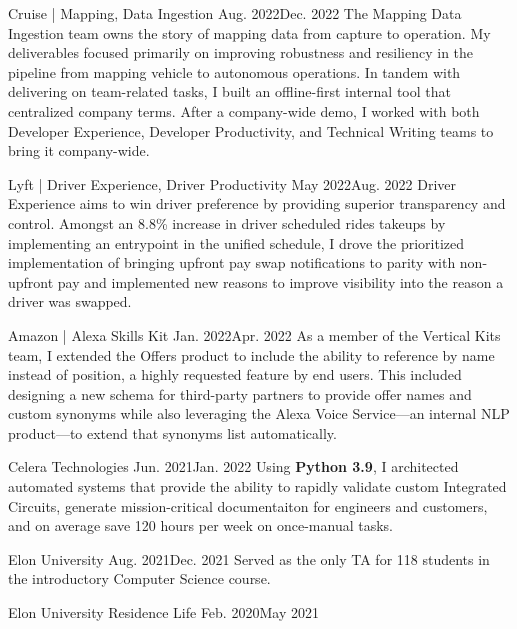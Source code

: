 \documentclass{listofpersonalprofessionalachievements}
\begin{document}
\begin{itemize}
    {Cruise | Mapping, Data Ingestion}
    {Aug. 2022}{Dec. 2022}
    {The Mapping Data Ingestion team owns the story of mapping data from capture to operation. My deliverables focused primarily on improving robustness and resiliency in the pipeline from mapping vehicle to autonomous operations. In tandem with delivering on team-related tasks, I built an offline-first internal tool that centralized company terms. After a company-wide demo, I worked with both Developer Experience, Developer Productivity, and Technical Writing teams to bring it company-wide.}

    {Lyft | Driver Experience, Driver Productivity}
    {May 2022}{Aug. 2022}
    {Driver Experience aims to win driver preference by providing superior transparency and control. Amongst an 8.8\% increase in driver scheduled rides takeups by implementing an entrypoint in the unified schedule, I drove the prioritized implementation of bringing upfront pay swap notifications to parity with non-upfront pay and implemented new reasons to improve visibility into the reason a driver was swapped.}

    {Amazon | Alexa Skills Kit}
    {Jan. 2022}{Apr. 2022}
    {As a member of the Vertical Kits team, I extended the Offers product to include the ability to reference by name instead of position, a highly requested feature by end users. This included designing a new schema for third-party partners to provide offer names and custom synonyms while also leveraging the Alexa Voice Service—an internal NLP product—to extend that synonyms list automatically.}

    {Celera Technologies}
    {Jun. 2021}{Jan. 2022}
    {Using \textbf{Python 3.9}, I architected automated systems that provide the ability to rapidly validate custom Integrated Circuits, generate mission-critical documentaiton for engineers and customers, and on average save 120 hours per week on once-manual tasks.}

    {Elon University}
    {Aug. 2021}{Dec. 2021}
    {Served as the only TA for 118 students in the introductory Computer Science course.}

    {Elon University Residence Life}
    {Feb. 2020}{May 2021}


\end{itemize}
\end{document}

